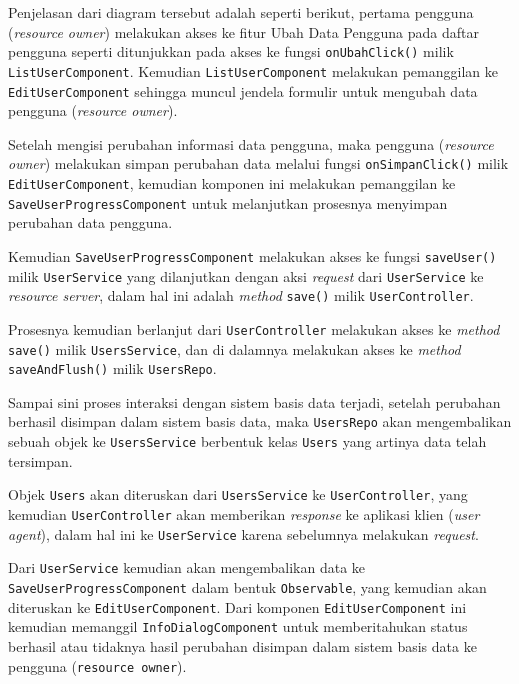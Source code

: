 \documentclass[pdftex,12pt, oneside]{article}
\begin{document}
\begin{itemize}
	Penjelasan dari diagram tersebut adalah seperti berikut, pertama pengguna (\textit{resource owner}) melakukan akses ke fitur Ubah Data Pengguna pada daftar pengguna seperti ditunjukkan pada akses ke fungsi \texttt{onUbahClick()} milik \texttt{ListUserComponent}. Kemudian \texttt{ListUserComponent} melakukan pemanggilan ke \texttt{EditUserComponent} sehingga muncul jendela formulir untuk mengubah data pengguna (\textit{resource owner}).
	
	Setelah mengisi perubahan informasi data pengguna, maka pengguna (\textit{resource owner}) melakukan simpan perubahan data melalui fungsi \texttt{onSimpanClick()} milik \texttt{EditUserComponent}, kemudian komponen ini melakukan pemanggilan ke \texttt{SaveUserProgressComponent} untuk melanjutkan prosesnya menyimpan perubahan data pengguna.
	
	Kemudian \texttt{SaveUserProgressComponent} melakukan akses ke fungsi \texttt{saveUser()} milik \texttt{UserService} yang dilanjutkan dengan aksi \textit{request} dari \texttt{UserService} ke \textit{resource server}, dalam hal ini adalah \textit{method} \texttt{save()} milik \texttt{UserController}.
	
	Prosesnya kemudian berlanjut dari \texttt{UserController} melakukan akses ke \textit{method} \texttt{save()} milik \texttt{UsersService}, dan di dalamnya melakukan akses ke \textit{method} \texttt{saveAndFlush()} milik \texttt{UsersRepo}.
	
	Sampai sini proses interaksi dengan sistem basis data terjadi, setelah perubahan berhasil disimpan dalam sistem basis data, maka \texttt{UsersRepo} akan mengembalikan sebuah objek ke \texttt{UsersService} berbentuk kelas \texttt{Users} yang artinya data telah tersimpan.
	
	Objek \texttt{Users} akan diteruskan dari \texttt{UsersService} ke \texttt{UserController}, yang kemudian \texttt{UserController} akan memberikan \textit{response} ke aplikasi klien (\textit{user agent}), dalam hal ini ke \texttt{UserService} karena sebelumnya melakukan \textit{request}.
	
	Dari \texttt{UserService} kemudian akan mengembalikan data ke \texttt{SaveUserProgressComponent} dalam bentuk \texttt{Observable}, yang kemudian akan diteruskan ke \texttt{EditUserComponent}. Dari komponen \texttt{EditUserComponent} ini kemudian memanggil \texttt{InfoDialogComponent} untuk memberitahukan status berhasil atau tidaknya hasil perubahan disimpan dalam sistem basis data ke pengguna (\texttt{resource owner}).
	

\end{itemize}
\end{document}
